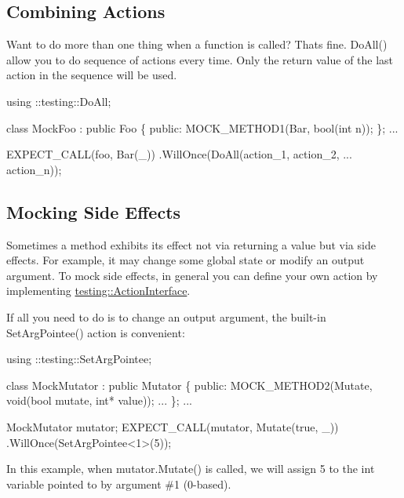 \subsection*{Combining Actions}

Want to do more than one thing when a function is called? That\textquotesingle{}s fine. {\ttfamily Do\+All()} allow you to do sequence of actions every time. Only the return value of the last action in the sequence will be used.


\begin{DoxyCode}
using ::testing::DoAll;

\textcolor{keyword}{class }MockFoo : \textcolor{keyword}{public} Foo \{
 \textcolor{keyword}{public}:
  MOCK\_METHOD1(Bar, \textcolor{keywordtype}{bool}(\textcolor{keywordtype}{int} n));
\};
...

  EXPECT\_CALL(foo, Bar(\_))
      .WillOnce(DoAll(action\_1,
                      action\_2,
                      ...
                      action\_n));
\end{DoxyCode}


\subsection*{Mocking Side Effects}

Sometimes a method exhibits its effect not via returning a value but via side effects. For example, it may change some global state or modify an output argument. To mock side effects, in general you can define your own action by implementing {\ttfamily \hyperlink{classtesting_1_1ActionInterface}{testing\+::\+Action\+Interface}}.

If all you need to do is to change an output argument, the built-\/in {\ttfamily Set\+Arg\+Pointee()} action is convenient\+:


\begin{DoxyCode}
using ::testing::SetArgPointee;

\textcolor{keyword}{class }MockMutator : \textcolor{keyword}{public} Mutator \{
 \textcolor{keyword}{public}:
  MOCK\_METHOD2(Mutate, \textcolor{keywordtype}{void}(\textcolor{keywordtype}{bool} mutate, \textcolor{keywordtype}{int}* value));
  ...
\};
...

  MockMutator mutator;
  EXPECT\_CALL(mutator, Mutate(\textcolor{keyword}{true}, \_))
      .WillOnce(SetArgPointee<1>(5));
\end{DoxyCode}


In this example, when {\ttfamily mutator.\+Mutate()} is called, we will assign 5 to the {\ttfamily int} variable pointed to by argument \#1 (0-\/based).

